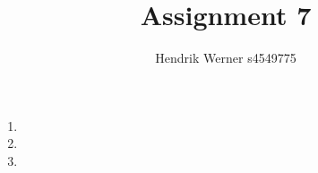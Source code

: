 \documentclass[12pt, a4paper]{article}
\title{Assignment 7}
\author{Hendrik Werner s4549775}
\begin{document}
\maketitle

\section{} %
\begin{enumerate}[a]
	\item %
	\item %
	\item %
\end{enumerate}

\section{} %
\end{document}
